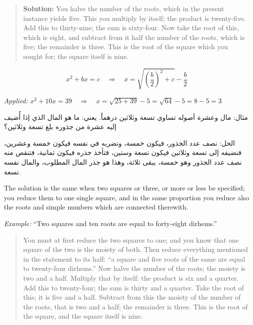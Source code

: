 \documentclass[11pt,a4paper,openany,oneside]{book}
\begin{document}
\begin{quote}
\textbf{Solution:} You halve the number of the roots, which in the present
instance yields five. This you multiply by itself; the product is twenty-five.
Add this to thirty-nine; the sum is sixty-four. Now take the root of this,
which is eight, and subtract from it half the number of the roots, which is
five; the remainder is three. This is the root of the square which you sought
for; the square itself is nine.
\end{quote}

\begin{mathbox}[title={\textbf{The Algorithm for Case IV}}]
\begin{equation}
x^2 + bx = c \quad\Longrightarrow\quad x = \sqrt{\left(\frac{b}{2}\right)^2 + c} - \frac{b}{2}
\end{equation}

\textit{Applied:} $x^2 + 10x = 39 \quad\Rightarrow\quad x = \sqrt{25 + 39} - 5 = \sqrt{64} - 5 = 8 - 5 = 3$
\end{mathbox}

\begin{arabicbox}
\begin{Arabic}
مثال: مال وعشرة أصوله تساوي تسعة وثلاثين درهماً. يعني: ما هو
المال الذي إذا أُضيف إليه عشرة من جذوره بلغ تسعة وثلاثين؟

الحل: نصف عدد الجذور، فيكون خمسة، ونضربه في نفسه فيكون
خمسة وعشرين، فنضيفه إلى تسعة وثلاثين فيكون تسعة وستين،
فتأخذ جذره فيكون ثمانية، فتنقص منه نصف عدد الجذور وهو خمسة،
يبقى ثلاثة، وهذا هو جذر المال المطلوب، والمال نفسه تسعة.
\end{Arabic}
\end{arabicbox}

The solution is the same when two squares or three, or more or less be
specified; you reduce them to one single square, and in the same proportion
you reduce also the roots and simple numbers which are connected therewith.

\textit{Example:} ``Two squares and ten roots are equal to forty-eight
  dirhems.''

\begin{quote}
You must at first reduce the two squares to one; and you know that one square
of the two is the moiety of both. Then reduce everything mentioned in the
statement to its half: ``a square and five roots of the same are equal to
twenty-four dirhems.'' Now halve the number of the roots; the moiety is two
and a half. Multiply that by itself: the product is six and a quarter. Add
this to twenty-four; the sum is thirty and a quarter. Take the root of this;
it is five and a half. Subtract from this the moiety of the number of the
roots, that is two and a half; the remainder is three. This is the root of
the square, and the square itself is nine.
\end{quote}
\end{document}
